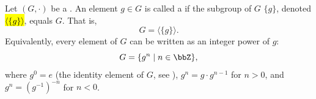 \begin{definition} \label{definition:cyclic_group}
Let $(G,\cdot)$ be a . An element $g \in G$ is called a  if the subgroup of $G$  $\{g\}$, denoted \hl{$\langle \{g\} \rangle$}, equals $G$. That is,
$$G = \langle \{g\} \rangle.$$
Equivalently, every element of $G$ can be written as an integer power of $g$:
$$G = \{ g^n \mid n \in \bbZ\},$$
where $g^0 = e$ (the identity element of $G$, see ), $g^n = g \cdot g^{n-1}$ for $n > 0$, and $g^n = (g^{-1})^{-n}$ for $n < 0$.

\end{definition}

